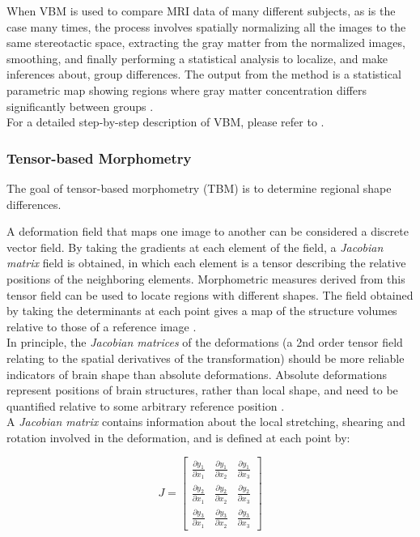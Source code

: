 When VBM is used to compare MRI data of many different subjects, as is
the case many times, the process involves spatially normalizing all
the images to the same stereotactic space, extracting the gray matter
from the normalized images, smoothing, and finally performing a
statistical analysis to localize, and make inferences about, group
differences. The output from the method is a statistical parametric
map showing regions where gray matter concentration differs
significantly between groups \cite{ashburner2}.\\


For a detailed step-by-step description of VBM, please refer to
\cite{ashburner2}.

\subsubsection{Tensor-based Morphometry}
The goal of tensor-based morphometry (TBM) is to determine regional
shape differences. 

A deformation field that maps one image to another can be considered a
discrete vector field. By taking the gradients at each element of the
field, a \textit{Jacobian matrix} field is obtained, in which each element is a
tensor describing the relative positions of the neighboring
elements. Morphometric measures derived from this tensor field can be
used to locate regions with different shapes. The field obtained by
taking the determinants at each point gives a map of the structure
volumes relative to those of a reference image \cite{ashburner2}.\\

In principle, the \textit{Jacobian matrices} of the deformations (a
2nd order tensor field relating to the spatial derivatives of the
transformation) should be more reliable indicators of brain shape than
absolute deformations. Absolute deformations represent positions of
brain structures, rather than local shape, and need to be quantified
relative to some arbitrary reference position \cite{ashburner}.\\

A \textit{Jacobian matrix} contains information about the local
stretching, shearing and rotation involved in the deformation, and is
defined at each point by:

\[
J = \begin{bmatrix}
  \frac{\partial y_1}{\partial x_1} & \frac{\partial y_1}{\partial x_2} & \frac{\partial y_1}{\partial x_3} \\[0.3em]
  \frac{\partial y_2}{\partial x_1} & \frac{\partial y_2}{\partial x_2} & \frac{\partial y_2}{\partial x_3} \\[0.3em]
  \frac{\partial y_3}{\partial x_1} & \frac{\partial y_3}{\partial x_2} & \frac{\partial y_3}{\partial x_3}
\end{bmatrix}
\]\\

